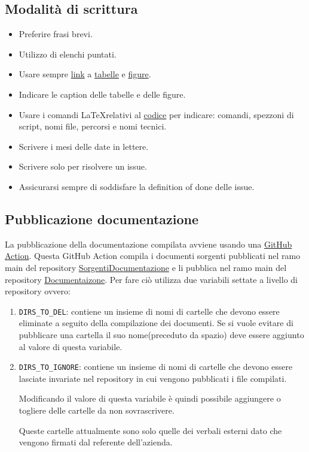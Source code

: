 \documentclass[a4paper, 12pt]{article}
\begin{document}
\subsection{Modalità di scrittura}
\label{subsec:mods}
\begin{itemize}
    \item Preferire frasi brevi.
    \item Utilizzo di elenchi puntati.
    \item Usare sempre \hyperref[subsub:link]{link} a \hyperref[subsub:tab]{tabelle} e \hyperref[subsub:fig]{figure}.
    \item Indicare le caption delle tabelle e delle figure.
    \item Usare i comandi \LaTeX \space relativi al \hyperref[subsub:cod]{codice} per indicare: comandi, spezzoni di script, nomi file, percorsi e nomi tecnici.
    \item Scrivere i mesi delle date in lettere.
    \item Scrivere solo per risolvere un issue.
    \item Assicurarsi sempre di soddisfare la definition of done delle issue.
\end{itemize}

\subsection{Pubblicazione documentazione}
\label{subsec:pub}
La pubblicazione della documentazione compilata avviene usando una \href{https://github.com/ALT-F4-eng/SorgentiDocumentazione/blob/main/.github/workflows/pubblicazione_compilati.yaml}{GitHub Action}.
Questa GitHub Action compila i documenti sorgenti pubblicati nel ramo main del repository \href{https://github.com/ALT-F4-eng/SorgentiDocumentazione}{SorgentiDocumentazione} e li pubblica nel ramo main del repository \href{https://github.com/ALT-F4-eng/Documentazione}{Documentaizone}. 
Per fare ciò utilizza due variabili settate a livello di repository ovvero:
\begin{enumerate}
    \item \lstinline|DIRS_TO_DEL|: contiene un insieme di nomi di cartelle che devono essere eliminate a seguito della compilazione dei documenti.
    Se si vuole evitare di pubblicare una cartella il suo nome(preceduto da spazio) deve essere aggiunto al valore di questa variabile.

    \item \lstinline|DIRS_TO_IGNORE|: contiene un insieme di nomi di cartelle che devono essere lasciate invariate nel repository in cui vengono pubblicati i file compilati.
    
    Modificando il valore di questa variabile è quindi possibile aggiungere o togliere delle cartelle da non sovrascrivere.

    Queste cartelle attualmente sono solo quelle dei verbali esterni dato che vengono firmati dal referente dell'azienda.
\end{enumerate}
\end{document}
